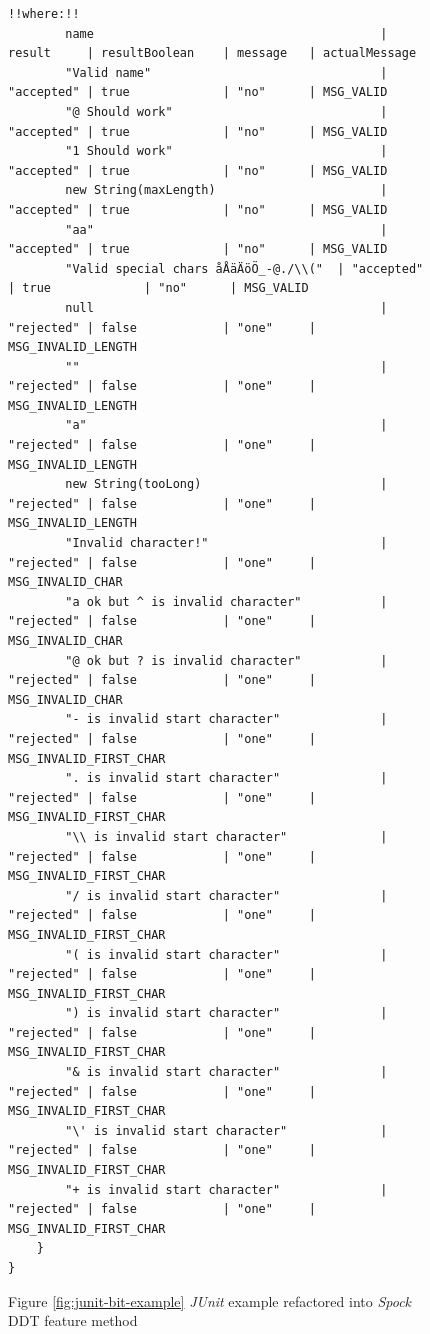 \begin{figure}[H]
\begin{lstlisting}[style=javatiny]
        !!where:!!
        name                                        | result     | resultBoolean    | message   | actualMessage
        "Valid name"                                | "accepted" | true             | "no"      | MSG_VALID
        "@ Should work"                             | "accepted" | true             | "no"      | MSG_VALID
        "1 Should work"                             | "accepted" | true             | "no"      | MSG_VALID
        new String(maxLength)                       | "accepted" | true             | "no"      | MSG_VALID
        "aa"                                        | "accepted" | true             | "no"      | MSG_VALID
        "Valid special chars åÅäÄöÖ_-@./\\("  | "accepted" | true             | "no"      | MSG_VALID
        null                                        | "rejected" | false            | "one"     | MSG_INVALID_LENGTH
        ""                                          | "rejected" | false            | "one"     | MSG_INVALID_LENGTH
        "a"                                         | "rejected" | false            | "one"     | MSG_INVALID_LENGTH
        new String(tooLong)                         | "rejected" | false            | "one"     | MSG_INVALID_LENGTH
        "Invalid character!"                        | "rejected" | false            | "one"     | MSG_INVALID_CHAR
        "a ok but ^ is invalid character"           | "rejected" | false            | "one"     | MSG_INVALID_CHAR
        "@ ok but ? is invalid character"           | "rejected" | false            | "one"     | MSG_INVALID_CHAR
        "- is invalid start character"              | "rejected" | false            | "one"     | MSG_INVALID_FIRST_CHAR
        ". is invalid start character"              | "rejected" | false            | "one"     | MSG_INVALID_FIRST_CHAR
        "\\ is invalid start character"             | "rejected" | false            | "one"     | MSG_INVALID_FIRST_CHAR
        "/ is invalid start character"              | "rejected" | false            | "one"     | MSG_INVALID_FIRST_CHAR
        "( is invalid start character"              | "rejected" | false            | "one"     | MSG_INVALID_FIRST_CHAR
        ") is invalid start character"              | "rejected" | false            | "one"     | MSG_INVALID_FIRST_CHAR
        "& is invalid start character"              | "rejected" | false            | "one"     | MSG_INVALID_FIRST_CHAR
        "\' is invalid start character"             | "rejected" | false            | "one"     | MSG_INVALID_FIRST_CHAR
        "+ is invalid start character"              | "rejected" | false            | "one"     | MSG_INVALID_FIRST_CHAR
    }
}
        \end{lstlisting}
        \caption{Figure \ref{fig:junit-bit-example} \textit{JUnit} example refactored into \textit{Spock} DDT feature method}
        \label{fig:spock-bit-example}
    \end{figure}

